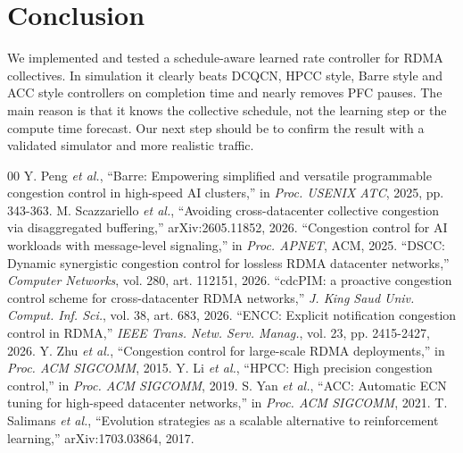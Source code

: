 \documentclass[conference]{IEEEtran}
\begin{document}
\section{Conclusion}
We implemented and tested a schedule-aware learned rate controller for RDMA collectives. In simulation it clearly beats DCQCN, HPCC style, Barre style and ACC style controllers on completion time and nearly removes PFC pauses. The main reason is that it knows the collective schedule, not the learning step or the compute time forecast. Our next step should be to confirm the result with a validated simulator and more realistic traffic.

\begin{thebibliography}{00}
 Y. Peng \emph{et al.}, ``Barre: Empowering simplified and versatile programmable congestion control in high-speed AI clusters,'' in \emph{Proc. USENIX ATC}, 2025, pp. 343-363.
 M. Scazzariello \emph{et al.}, ``Avoiding cross-datacenter collective congestion via disaggregated buffering,'' arXiv:2605.11852, 2026.
 ``Congestion control for AI workloads with message-level signaling,'' in \emph{Proc. APNET}, ACM, 2025.
 ``DSCC: Dynamic synergistic congestion control for lossless RDMA datacenter networks,'' \emph{Computer Networks}, vol. 280, art. 112151, 2026.
 ``cdcPIM: a proactive congestion control scheme for cross-datacenter RDMA networks,'' \emph{J. King Saud Univ. Comput. Inf. Sci.}, vol. 38, art. 683, 2026.
 ``ENCC: Explicit notification congestion control in RDMA,'' \emph{IEEE Trans. Netw. Serv. Manag.}, vol. 23, pp. 2415-2427, 2026.
 Y. Zhu \emph{et al.}, ``Congestion control for large-scale RDMA deployments,'' in \emph{Proc. ACM SIGCOMM}, 2015.
 Y. Li \emph{et al.}, ``HPCC: High precision congestion control,'' in \emph{Proc. ACM SIGCOMM}, 2019.
 S. Yan \emph{et al.}, ``ACC: Automatic ECN tuning for high-speed datacenter networks,'' in \emph{Proc. ACM SIGCOMM}, 2021.
 T. Salimans \emph{et al.}, ``Evolution strategies as a scalable alternative to reinforcement learning,'' arXiv:1703.03864, 2017.
\end{thebibliography}
\end{document}

